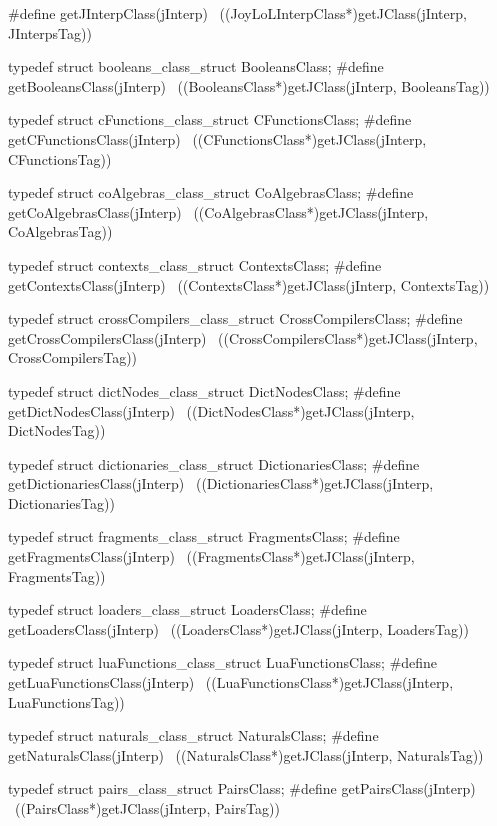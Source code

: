 #define getJInterpClass(jInterp)                            \
  ((JoyLoLInterpClass*)getJClass(jInterp, JInterpsTag))

typedef struct booleans_class_struct BooleansClass;
#define getBooleansClass(jInterp)                           \
  ((BooleansClass*)getJClass(jInterp, BooleansTag))

typedef struct cFunctions_class_struct CFunctionsClass;
#define getCFunctionsClass(jInterp)                         \
  ((CFunctionsClass*)getJClass(jInterp, CFunctionsTag))

typedef struct coAlgebras_class_struct CoAlgebrasClass;
#define getCoAlgebrasClass(jInterp)                         \
  ((CoAlgebrasClass*)getJClass(jInterp, CoAlgebrasTag))

typedef struct contexts_class_struct ContextsClass;
#define getContextsClass(jInterp)                           \
  ((ContextsClass*)getJClass(jInterp, ContextsTag))

typedef struct crossCompilers_class_struct CrossCompilersClass;
#define getCrossCompilersClass(jInterp)                     \
  ((CrossCompilersClass*)getJClass(jInterp, CrossCompilersTag))

typedef struct dictNodes_class_struct DictNodesClass;
#define getDictNodesClass(jInterp)                          \
  ((DictNodesClass*)getJClass(jInterp, DictNodesTag))

typedef struct dictionaries_class_struct DictionariesClass;
#define getDictionariesClass(jInterp)                       \
  ((DictionariesClass*)getJClass(jInterp, DictionariesTag))

typedef struct fragments_class_struct FragmentsClass;
#define getFragmentsClass(jInterp)                          \
  ((FragmentsClass*)getJClass(jInterp, FragmentsTag))

typedef struct loaders_class_struct LoadersClass;
#define getLoadersClass(jInterp)                            \
  ((LoadersClass*)getJClass(jInterp, LoadersTag))

typedef struct luaFunctions_class_struct LuaFunctionsClass;
#define getLuaFunctionsClass(jInterp)                       \
  ((LuaFunctionsClass*)getJClass(jInterp, LuaFunctionsTag))

typedef struct naturals_class_struct NaturalsClass;
#define getNaturalsClass(jInterp)                           \
  ((NaturalsClass*)getJClass(jInterp, NaturalsTag))

typedef struct pairs_class_struct PairsClass;
#define getPairsClass(jInterp)                              \
  ((PairsClass*)getJClass(jInterp, PairsTag))


